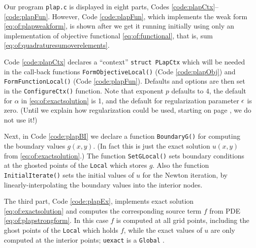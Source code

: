 Our program \texttt{plap.c} is displayed in eight parts, Codes \ref{code:plapCtx}--\ref{code:plapFun}.  However, Code \ref{code:plapFun}, which implements the weak form \eqref{eq:of:plapweakform}, is shown after we get it running initially using only an implementation of objective functional \eqref{eq:of:functional}, that is, sum \eqref{eq:of:quadraturesumoverelements}.


Code \ref{code:plapCtx} declares a ``context'' \texttt{struct PLapCtx} which will be needed in the call-back functions \texttt{FormObjectiveLocal()} (Code \ref{code:plapObj}) and \texttt{FormFunctionLocal()} (Code \ref{code:plapFun}).  Defaults and \PETSc options are then set in the \texttt{ConfigureCtx()} function.  Note that exponent $p$ defaults to 4, the default for $\alpha$ in \eqref{eq:of:exactsolution} is 1, and the default for regularization parameter $\epsilon$ is zero.  (Until we explain how regularization could be used, starting on page \pageref{page:of:condellip}, we do not use it!)


Next, in Code \ref{code:plapBI} we declare a function \texttt{BoundaryG()} for computing the boundary values $g(x,y)$.  (In fact this is just the exact solution $u(x,y)$ from \eqref{eq:of:exactsolution}.)  The function \texttt{SetGLocal()} sets boundary conditions at the ghosted points of the \texttt{Local} \pVec which stores $g$.  Also the function \texttt{InitialIterate()} sets the initial values of $u$ for the Newton iteration, by linearly-interpolating the boundary values into the interior nodes.

The third part, Code \ref{code:plapEx}, implements exact solution \eqref{eq:of:exactsolution} and computes the corresponding source term $f$ from PDE \eqref{eq:of:plapstrongform}.  In this case $f$ is computed at all grid points, including the ghost points of the \texttt{Local} \pVec which holds $f$, while the exact values of $u$ are only computed at the interior points; \texttt{uexact} is a \texttt{Global} \pVec.

